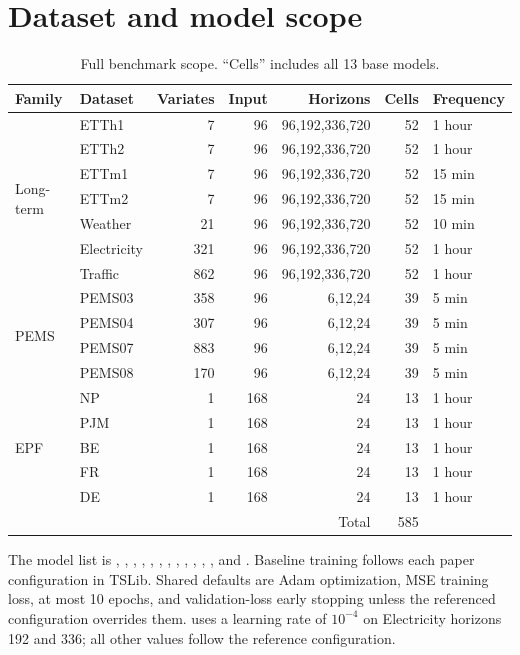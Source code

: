 \section{Dataset and model scope}
\label{app:data}

\begin{table}[h]
\centering
\small
\setlength{\tabcolsep}{3.5pt}
\caption{Full benchmark scope. ``Cells'' includes all 13 base models.}
\label{tab:dataset-scope}
\begin{tabular}{llrrrrl}
\toprule
Family & Dataset & Variates & Input & Horizons & Cells & Frequency\\
\midrule
\multirow{7}{*}{Long-term}
& ETTh1 & 7 & 96 & 96,192,336,720 & 52 & 1 hour\\
& ETTh2 & 7 & 96 & 96,192,336,720 & 52 & 1 hour\\
& ETTm1 & 7 & 96 & 96,192,336,720 & 52 & 15 min\\
& ETTm2 & 7 & 96 & 96,192,336,720 & 52 & 15 min\\
& Weather & 21 & 96 & 96,192,336,720 & 52 & 10 min\\
& Electricity & 321 & 96 & 96,192,336,720 & 52 & 1 hour\\
& Traffic & 862 & 96 & 96,192,336,720 & 52 & 1 hour\\
\midrule
\multirow{4}{*}{PEMS}
& PEMS03 & 358 & 96 & 6,12,24 & 39 & 5 min\\
& PEMS04 & 307 & 96 & 6,12,24 & 39 & 5 min\\
& PEMS07 & 883 & 96 & 6,12,24 & 39 & 5 min\\
& PEMS08 & 170 & 96 & 6,12,24 & 39 & 5 min\\
\midrule
\multirow{5}{*}{EPF}
& NP & 1 & 168 & 24 & 13 & 1 hour\\
& PJM & 1 & 168 & 24 & 13 & 1 hour\\
& BE & 1 & 168 & 24 & 13 & 1 hour\\
& FR & 1 & 168 & 24 & 13 & 1 hour\\
& DE & 1 & 168 & 24 & 13 & 1 hour\\
\midrule
\multicolumn{5}{r}{Total} & 585 & \\
\bottomrule
\end{tabular}
\end{table}

The model list is \timexer{}, \timemixer{}, \pattn{}, \itransformer{}, \timesnet{},
\patchtst{}, \dlinear{}, \frets{}, \fedformer{}, \nonstat{}, \lightts{},
\informer{}, and \autoformer{}. Baseline training follows each paper configuration
in TSLib. Shared defaults are Adam optimization, MSE training loss, at most 10
epochs, and validation-loss early stopping unless the referenced configuration
overrides them. \nonstat{} uses a learning rate of $10^{-4}$
on Electricity horizons 192 and 336; all other values follow the reference
configuration.

